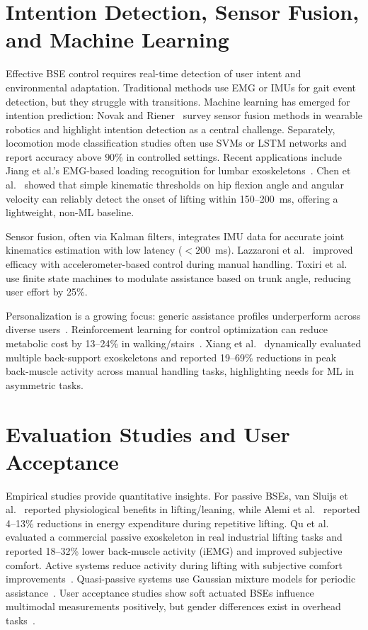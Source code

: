 \section{Intention Detection, Sensor Fusion, and Machine Learning}
Effective BSE control requires real-time detection of user intent and environmental adaptation. Traditional methods use EMG or IMUs for gait event detection, but they struggle with transitions. Machine learning has emerged for intention prediction: Novak and Riener~\cite{novak2015} survey sensor fusion methods in wearable robotics and highlight intention detection as a central challenge. Separately, locomotion mode classification studies often use SVMs or LSTM networks and report accuracy above $90$\% in controlled settings. Recent applications include Jiang et al.'s EMG-based loading recognition for lumbar exoskeletons~\cite{jiang2024}. Chen et al.~\cite{chen2018} showed that simple kinematic thresholds on hip flexion angle and angular velocity can reliably detect the onset of lifting within 150--200~ms, offering a lightweight, non-ML baseline.

Sensor fusion, often via Kalman filters, integrates IMU data for accurate joint kinematics estimation with low latency ($<200$~ms). Lazzaroni et al.~\cite{lazzaroni2022} improved efficacy with accelerometer-based control during manual handling. Toxiri et al.~\cite{toxiri2018} use finite state machines to modulate assistance based on trunk angle, reducing user effort by 25\%.

Personalization is a growing focus: generic assistance profiles underperform across diverse users~\cite{kermavnar2021,luger2023}. Reinforcement learning for control optimization can reduce metabolic cost by 13--24\% in walking/stairs~\cite{luo2023}. Xiang et al.~\cite{xiang2023} dynamically evaluated multiple back-support exoskeletons and reported 19--69\% reductions in peak back-muscle activity across manual handling tasks, highlighting needs for ML in asymmetric tasks.

\section{Evaluation Studies and User Acceptance}
Empirical studies provide quantitative insights. For passive BSEs, van Sluijs et al.~\cite{vanSluijs2023} reported physiological benefits in lifting/leaning, while Alemi et al.~\cite{alemi2020} reported 4--13\% reductions in energy expenditure during repetitive lifting. Qu et al.~\cite{qu2021} evaluated a commercial passive exoskeleton in real industrial lifting tasks and reported 18--32\% lower back-muscle activity (iEMG) and improved subjective comfort. Active systems reduce activity during lifting with subjective comfort improvements~\cite{schwartz2023}. Quasi-passive systems use Gaussian mixture models for periodic assistance~\cite{jamsek2020}. User acceptance studies show soft actuated BSEs influence multimodal measurements positively, but gender differences exist in overhead tasks~\cite{refai2023,nussbaum2023}.

